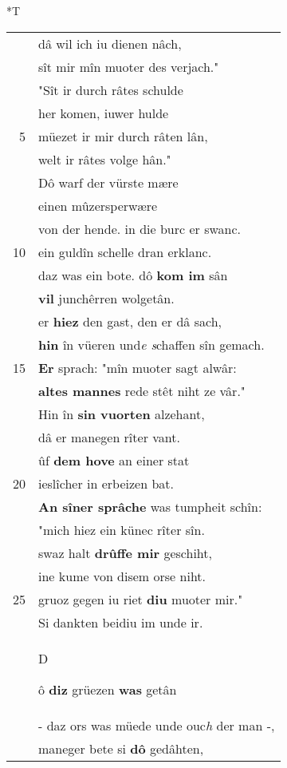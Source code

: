 \documentclass[8pt,a4paper,notitlepage]{article}
\begin{document}
\begin{table}[ht]
\begin{minipage}[t]{0.5\linewidth}
\small
\begin{center}*T
\end{center}
\begin{tabular}{rl}
 & dâ wil ich iu dienen nâch,\\ 
 & sît mir mîn muoter des verjach."\\ 
 & "Sît ir durch râtes schulde\\ 
 & her komen, iuwer hulde\\ 
5 & müezet ir mir durch râten lân,\\ 
 & welt ir râtes volge hân."\\ 
 & Dô warf der vürste mære\\ 
 & einen mûzersperwære\\ 
 & von der hende. in die burc er swanc.\\ 
10 & ein guldîn schelle dran erklanc.\\ 
 & daz was ein bote. dô \textbf{kom im} sân\\ 
 & \textbf{vil} junchêrren wolgetân.\\ 
 & er \textbf{hiez} den gast, den er dâ sach,\\ 
 & \textbf{hin} în vüeren und\textit{e s}chaffen sîn gemach.\\ 
15 & \textbf{Er} sprach: "mîn muoter sagt alwâr:\\ 
 & \textbf{altes mannes} rede stêt niht ze vâr."\\ 
 & Hin în \textbf{sin vuorten} alzehant,\\ 
 & dâ er manegen rîter vant.\\ 
 & ûf \textbf{dem hove} an einer stat\\ 
20 & ieslîcher in erbeizen bat.\\ 
 & \textbf{An sîner sprâche} was tumpheit schîn:\\ 
 & "mich hiez ein künec rîter sîn.\\ 
 & swaz halt \textbf{drûffe mir} geschiht,\\ 
 & ine kume von disem orse niht.\\ 
25 & gruoz gegen iu riet \textbf{diu} muoter mir."\\ 
 & Si dankten beidiu im unde ir.\\ 
 & \begin{large}D\end{large}ô \textbf{diz} grüezen \textbf{was} getân\\ 
 & - daz ors was müede unde ouc\textit{h} der man -,\\ 
 & maneger bete si \textbf{dô} gedâhten,\\ 

\end{tabular}
\end{minipage}
\end{table}
\end{document}
